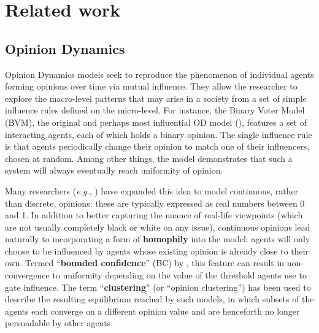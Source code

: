\section{Related work}

\subsection{Opinion Dynamics}

Opinion Dynamics models seek to reproduce the phenomenon of individual agents
forming opinions over time via mutual influence. They allow the researcher to
explore the macro-level patterns that may arise in a society from a set
of simple influence rules defined on the micro-level. For instance, the Binary
Voter Model (BVM), the original and perhaps most influential OD model
(\cite{clifford_model_1973, holley_ergodic_1975}), features a set of
interacting agents, each of which holds a binary opinion. The single influence
rule is that agents periodically change their opinion to match one of their
influencers, chosen at random. Among other things, the model demonstrates that
such a system will always eventually reach uniformity of opinion.

Many researchers (\textit{e.g.}, \cite{ghaderi_opinion_2012,
weisbuch_interacting_2001}) have expanded this idea to model continuous, rather
than discrete, opinions: these are typically expressed as real numbers between
0 and 1. In addition to better capturing the nuance of real-life viewpoints
(which are not usually completely black or white on any issue), continuous
opinions lead naturally to incorporating a form of
\textbf{homophily}\cite{mcpherson_birds_2001} into the model: agents will only
choose to be influenced by agents whose existing opinion is already close to
their own. Termed ``\textbf{bounded confidence}'' (BC) by
\cite{hegselmann_opinion_2002}, this feature can result in non-convergence to
uniformity depending on the value of the threshold agents use to gate
influence.\cite{hegselmann_opinion_2002, deffuant_mixing_2000,
tsang_opinion_2014} The term ``\textbf{clustering}'' (or ``opinion
clustering'') has been used to describe the resulting equilibrium reached by
such models, in which subsets of the agents each converge on a different
opinion value and are henceforth no longer persuadable by other agents.


